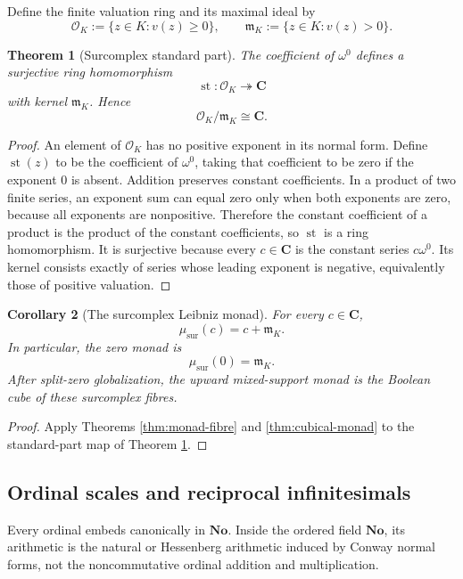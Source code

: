 \documentclass[11pt]{amsart}
\numberwithin{equation}{section}
\newtheorem{theorem}{Theorem}[section]
\newtheorem{corollary}[theorem]{Corollary}
\theoremstyle{definition}
\newcommand{\C}{\mathbf C}
\newcommand{\No}{\mathbf{No}}
\newcommand{\st}{\operatorname{st}}
\newcommand{\cO}{\mathcal O}
\begin{document}
Define the finite valuation ring and its maximal ideal by
\[
\cO_K:=\{z\in K:v(z)\ge0\},
\qquad
\mathfrak m_K:=\{z\in K:v(z)>0\}.
\]

\begin{theorem}[Surcomplex standard part]\label{thm:surcomplex-standard-part}
The coefficient of $\omega^0$ defines a surjective ring homomorphism
\[
\st:\cO_K\twoheadrightarrow\C
\]
with kernel $\mathfrak m_K$.  Hence
\[
\cO_K/\mathfrak m_K\cong\C.
\]
\end{theorem}

\begin{proof}
An element of $\cO_K$ has no positive exponent in its normal form.  Define $\st(z)$ to be the coefficient of $\omega^0$, taking that coefficient to be zero if the exponent $0$ is absent.  Addition preserves constant coefficients.  In a product of two finite series, an exponent sum can equal zero only when both exponents are zero, because all exponents are nonpositive.  Therefore the constant coefficient of a product is the product of the constant coefficients, so $\st$ is a ring homomorphism.  It is surjective because every $c\in\C$ is the constant series $c\omega^0$.  Its kernel consists exactly of series whose leading exponent is negative, equivalently those of positive valuation.
\end{proof}

\begin{corollary}[The surcomplex Leibniz monad]\label{cor:surcomplex-monad}
For every $c\in\C$,
\[
\mu_{\mathrm{sur}}(c)
=
c+\mathfrak m_K.
\]
In particular, the zero monad is
\[
\mu_{\mathrm{sur}}(0)=\mathfrak m_K.
\]
After split-zero globalization, the upward mixed-support monad is the Boolean cube of these surcomplex fibres.
\end{corollary}

\begin{proof}
Apply Theorems \ref{thm:monad-fibre} and \ref{thm:cubical-monad} to the standard-part map of Theorem \ref{thm:surcomplex-standard-part}.
\end{proof}

\subsection{Ordinal scales and reciprocal infinitesimals}

Every ordinal embeds canonically in $\No$.  Inside the ordered field $\No$, its arithmetic is the natural or Hessenberg arithmetic induced by Conway normal forms, not the noncommutative ordinal addition and multiplication.
\end{document}
